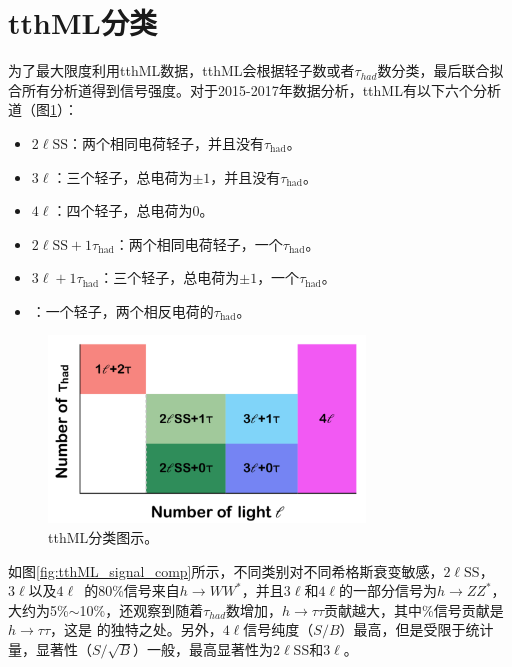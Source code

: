 \section{tthML分类}
为了最大限度利用tthML数据，tthML会根据轻子数或者$\tau_{had}$数分类，最后联合拟合所有分析道得到信号强度。对于2015-2017年数据分析，tthML有以下六个分析道（图\ref{fig:tthML_cates}）：
\begin{itemize}
 \item $2\ell\text{SS}$：两个相同电荷轻子，并且没有$\tau_{\text{had}}$。
 \item $3\ell$：三个轻子，总电荷为$\pm1$，并且没有$\tau_{\text{had}}$。
 \item $4\ell$：四个轻子，总电荷为0。
 \item $2\ell\text{SS}+1\tau_{\text{had}}$：两个相同电荷轻子，一个$\tau_{\text{had}}$。
 \item $3\ell+1\tau_{\text{had}}$：三个轻子，总电荷为$\pm1$，一个$\tau_{\text{had}}$。
 \item \ltwotau ：一个轻子，两个相反电荷的$\tau_{\text{had}}$。
\end{itemize}
\begin{figure}[h]
\centering
 \includegraphics[width=0.75\textwidth]{fig/tthML_cates.png}
 \caption{tthML分类图示。}
 \label{fig:tthML_cates}
\end{figure}
如图\ref{fig:tthML_signal_comp}所示，不同类别对不同希格斯衰变敏感，$2\ell\text{SS}$，$3\ell$以及$4\ell$~的80\%信号来自$h\rightarrow WW^*$，并且$3\ell$和$4\ell$的一部分信号为$h\rightarrow ZZ^*$，大约为5\%$\sim$10\%，还观察到随着$\tau_{had}$数增加，$h\rightarrow \tau\tau$贡献越大，其中\%信号贡献是$h\rightarrow \tau\tau$，这是
\ltwotau 的独特之处。另外，$4\ell$信号纯度（$S/B$）最高，但是受限于统计量，显著性（$S/\sqrt{B}$）一般，最高显著性为$2\ell\text{SS}$和$3\ell$。
